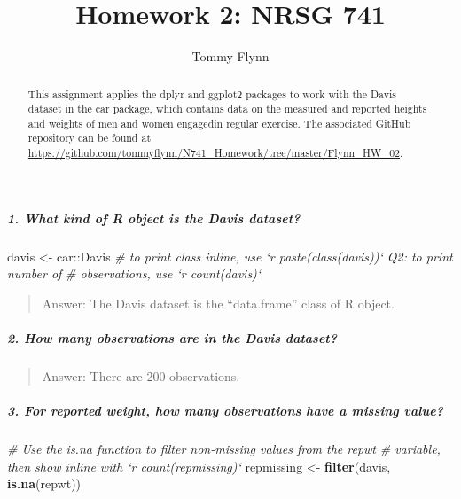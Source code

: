\documentclass[]{elsarticle} %
\newenvironment{Shaded}{\begin{snugshade}}{\end{snugshade}}
\newcommand{\KeywordTok}[1]{\textcolor[rgb]{0.13,0.29,0.53}{\textbf{{#1}}}}
\newcommand{\StringTok}[1]{\textcolor[rgb]{0.31,0.60,0.02}{{#1}}}
\newcommand{\CommentTok}[1]{\textcolor[rgb]{0.56,0.35,0.01}{\textit{{#1}}}}
\newcommand{\NormalTok}[1]{{#1}}
\begin{document}
\begin{frontmatter}

  \title{Homework 2: NRSG 741}
    \author[Emory University]{Tommy Flynn}
      \address[Emory University]{Emory School of Nursing 1520 Clifton Rd Atlanta GA 30322}
  
  \begin{abstract}
  This assignment applies the dplyr and ggplot2 packages to work with the
  Davis dataset in the car package, which contains data on the measured
  and reported heights and weights of men and women engagedin regular
  exercise. The associated GitHub repository can be found at
  \url{https://github.com/tommyflynn/N741_Homework/tree/master/Flynn_HW_02}.
  \end{abstract}
  
 \end{frontmatter}

\subparagraph{1. What kind of R object is the Davis
dataset?}\label{what-kind-of-r-object-is-the-davis-dataset}

\begin{Shaded}
\begin{Highlighting}[]
\NormalTok{davis <-}\StringTok{ }\NormalTok{car::Davis}
\CommentTok{# to print class inline, use `r paste(class(davis))` Q2: to print number of}
\CommentTok{# observations, use `r count(davis)`}
\end{Highlighting}
\end{Shaded}

\begin{quote}
Answer: The Davis dataset is the ``data.frame'' class of R object.
\end{quote}

\subparagraph{2. How many observations are in the Davis
dataset?}\label{how-many-observations-are-in-the-davis-dataset}

\begin{quote}
Answer: There are 200 observations.
\end{quote}

\subparagraph{3. For reported weight, how many observations have a
missing
value?}\label{for-reported-weight-how-many-observations-have-a-missing-value}

\begin{Shaded}
\begin{Highlighting}[]
\CommentTok{# Use the is.na function to filter non-missing values from the repwt}
\CommentTok{# variable, then show inline with `r count(repmissing)`}
\NormalTok{repmissing <-}\StringTok{ }\KeywordTok{filter}\NormalTok{(davis, }\KeywordTok{is.na}\NormalTok{(repwt))}
\end{Highlighting}
\end{Shaded}
\end{document}
